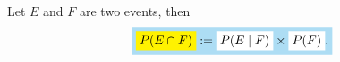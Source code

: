 \documentclass[compress]{beamer}
\begin{document}
%
%
%
%
%
%





\begin{frame}
{
Let $E$ and $F$ are two events, then 
$$\HLTEQ[babyblue!70]{ \HLTY{P(E\cap F)}:=\HLTW{P(E\mid F)}\times \HLTW{P(F)}.}$$
}
\vspace{2.5in}
\end{frame}



%
%
%


%
%
\end{document}
